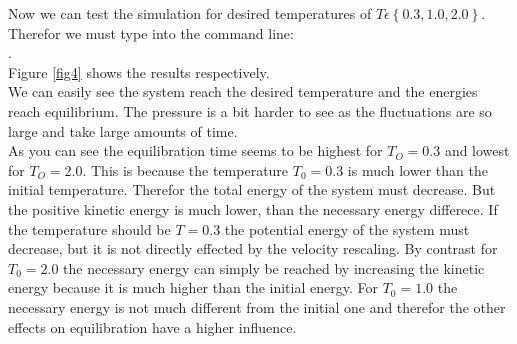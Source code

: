 Now we can test the simulation for desired temperatures of  $T\epsilon\left\lbrace 0.3,1.0,2.0\right\rbrace $. 
Therefor we must type into the command line:\\

.\\


Figure \ref{fig4} shows the results respectively.\\

We can easily see the system reach the desired temperature and the energies reach equilibrium. The pressure is a bit harder to see as the fluctuations are so large and take large amounts of time.\\

As you can see the equilibration time seems to be highest for $T_O=0.3$ and lowest for $T_O=2.0$. 
This is because the temperature $T_0=0.3$ is much lower than the initial temperature. 
Therefor the total energy of the system must decrease. But the positive kinetic energy is much lower, than the necessary energy differece. 
If the temperature should be $T=0.3$ the potential energy of the system must decrease, but it is not directly effected by the velocity rescaling.
By contrast for $T_0=2.0$ the necessary energy can simply  be reached by increasing the kinetic energy because it is much higher than the initial energy.
For $T_0=1.0$ the necessary energy is not much different from the initial one and therefor the other effects on equilibration have a higher influence.

\FloatBarrier